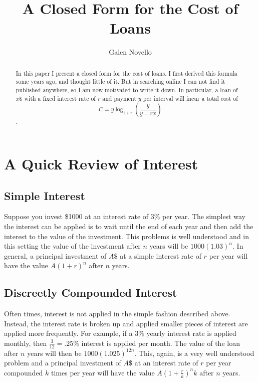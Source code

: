 \documentclass[11pt]{article} %
\title{A Closed Form for the Cost of Loans}
\author{Galen Novello}
\begin{document}
\maketitle

\begin{abstract}
In this paper I present a closed form for the cost of loans.  I first derived this formula some years ago, and thought little of it.  But in searching online I can not find it published anywhere, so I am now motivated to write it down.  In particular, a loan of $x\$ $ with a fixed interest rate of $r$ and payment $y$ per interval will incur a total cost of $$C = y\log_{1+r} \left( \frac{y}{y-rx} \right)$$.
\end{abstract}

\section{A Quick Review of Interest}
\subsection{Simple Interest}
Suppose you invest \$1000 at an interest rate of 3\% per year.  The simplest way the interest can be applied is to wait until the end of each year and then add the interest to the value of the investment.  This problems is well understood and in this setting the value of the investment after $n$ years will be $1000(1.03)^{n}$.  In general, a principal investment of $A\$$ at a simple interest rate of $r$ per year will have the value $A(1+r)^n$ after $n$ years.

\subsection{Discreetly Compounded Interest}
Often times, interest is not applied in the simple fashion described above.  Instead, the interest rate is broken up and applied smaller pieces of interest are applied more frequently. For example, if a $3\%$ yearly interest rate is applied monthly, then $\frac{3}{12} = .25\%$ interest is applied per month. The value of the loan after $n$ years will then be $1000(1.025)^{12n}$.  This, again, is a very well understood problem and a principal investment of $A\$$ at an interest rate of $r$ per year compounded $k$ times per year will have the value $A(1+\frac{r}{k})^nk$ after $n$ years.
\end{document}
